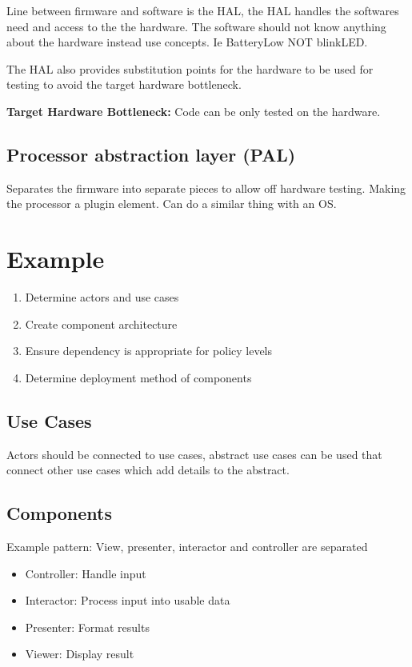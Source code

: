 \documentclass[11pt]{scrartcl} %
\begin{document}
Line between firmware and software is the HAL, the HAL handles the softwares need and access to the
the hardware. The software should not know anything about the hardware instead use concepts. Ie
BatteryLow NOT blinkLED.

The HAL also provides substitution points for the hardware to be used for testing to avoid the
target hardware bottleneck.

\textbf{Target Hardware Bottleneck:} Code can be only tested on the hardware.

\subsection{Processor abstraction layer (PAL)}

Separates the firmware into separate pieces to allow off hardware testing. Making the processor a 
plugin element. Can do a similar thing with an OS.

\section{Example}

\begin{enumerate}
  \item Determine actors and use cases
  \item Create component architecture
  \item Ensure dependency is appropriate for policy levels
  \item Determine deployment method of components
\end{enumerate}

\subsection{Use Cases}

Actors should be connected to use cases, abstract use cases can be used that connect other use
cases which add details to the abstract.

\subsection{Components}

Example pattern: View, presenter, interactor and controller are separated

\begin{itemize}
  \item Controller: Handle input
  \item Interactor: Process input into usable data
  \item Presenter: Format results
  \item Viewer: Display result
\end{itemize}
\end{document}
